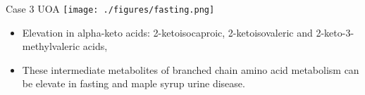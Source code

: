 \documentclass[presentation, smaller]{beamer}
\begin{document}
\begin{frame}[label={sec:orgheadline21}]{Case 3 UOA}
\texttt{[image: ./figures/fasting.png]}

\pause

\begin{itemize}
\item Elevation in alpha-keto acids: 2-ketoisocaproic, 2-ketoisovaleric
and 2-keto-3-methylvaleric acids,
\item These intermediate metabolites of branched chain amino acid
metabolism can be elevate in fasting and maple syrup urine
disease.
\end{itemize}
\end{frame}
\end{document}
